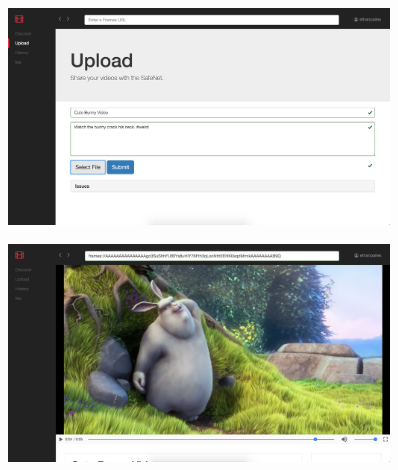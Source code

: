 \documentclass[final]{beamer}
\newlength{\sepwid}
\newlength{\onecolwid}
\newlength{\twocolwid}
\begin{document}
\begin{frame}[t]
\begin{columns}[t]
\begin{column}{\twocolwid}
\begin{columns}[t,totalwidth=\twocolwid] %


\end{columns} %

\end{column} %

\begin{column}{\sepwid}\end{column} %

\begin{column}{\onecolwid} %


\begin{block}{}

  \begin{figure}
  \includegraphics[width=0.8\linewidth]{upload-page.png}
  \captionsetup{labelformat=empty}
  \label{fig:upload-page}
  \end{figure}

  \begin{figure}
  \includegraphics[width=0.8\linewidth]{watch-page.png}
  \captionsetup{labelformat=empty}
  \label{fig:watch-page}
  \end{figure}


\end{block}
\end{column}
\end{columns}
\end{frame}
\end{document}
